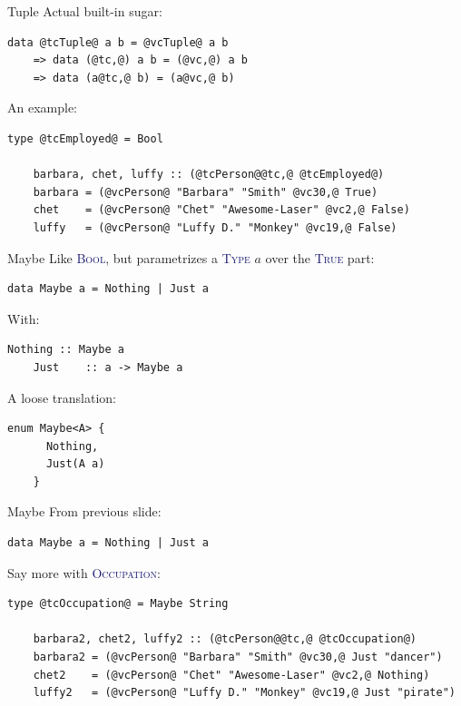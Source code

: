 \documentclass[xcolor={usenames,dvipsnames}]{beamer}
\newcommand{\htycon}[1]{\textcolor{MidnightBlue}{\textsc{#1}}}
\begin{document}
\begin{frame}[fragile]{Tuple}
  Actual built-in sugar:
  \begin{lstlisting}[style=hask]
       data @tcTuple@ a b = @vcTuple@ a b
    => data (@tc,@) a b = (@vc,@) a b
    => data (a@tc,@ b) = (a@vc,@ b)
  \end{lstlisting}

  An example:
  \begin{lstlisting}[style=hask]
    type @tcEmployed@ = Bool

    barbara, chet, luffy :: (@tcPerson@@tc,@ @tcEmployed@)
    barbara = (@vcPerson@ "Barbara" "Smith" @vc30,@ True)
    chet    = (@vcPerson@ "Chet" "Awesome-Laser" @vc2,@ False)
    luffy   = (@vcPerson@ "Luffy D." "Monkey" @vc19,@ False)
  \end{lstlisting}
\end{frame}

\begin{frame}[fragile]{Maybe}
  Like \htycon{Bool}, but parametrizes a \htycon{Type} $a$ over the \htycon{True} part:
  \begin{lstlisting}[style=hask]
    data Maybe a = Nothing | Just a
  \end{lstlisting}

  With:
  \begin{lstlisting}[style=hask]
    Nothing :: Maybe a
    Just    :: a -> Maybe a
  \end{lstlisting}

  A loose translation:
  \begin{lstlisting}[style=hask]
    enum Maybe<A> {
      Nothing,
      Just(A a)
    }
  \end{lstlisting}
\end{frame}

\begin{frame}[fragile]{Maybe}
  From previous slide:
  \begin{lstlisting}[style=hask]
    data Maybe a = Nothing | Just a
  \end{lstlisting}

  Say more with \htycon{Occupation}:
  \begin{lstlisting}[style=hask]
    type @tcOccupation@ = Maybe String

    barbara2, chet2, luffy2 :: (@tcPerson@@tc,@ @tcOccupation@)
    barbara2 = (@vcPerson@ "Barbara" "Smith" @vc30,@ Just "dancer")
    chet2    = (@vcPerson@ "Chet" "Awesome-Laser" @vc2,@ Nothing)
    luffy2   = (@vcPerson@ "Luffy D." "Monkey" @vc19,@ Just "pirate")
  \end{lstlisting}
\end{frame}
\end{document}
